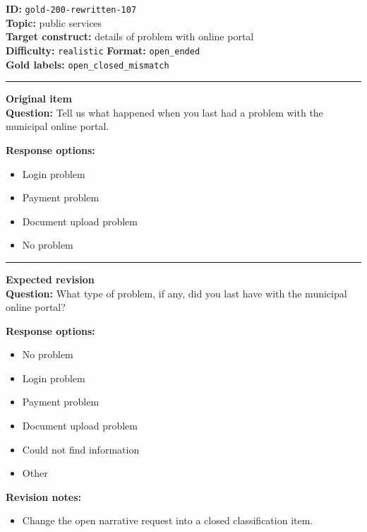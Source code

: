 \documentclass[10pt,a4paper]{article}
\newcommand{\sectionline}{\vspace{0.15em}\hrule\vspace{0.35em}}
\begin{document}
\begin{tcolorbox}[colframe=FlawRed,colback=white,colbacktitle=FlawRed!9,coltitle=black,title={Item 107\hfill Flawed item}]
\textbf{ID:} \texttt{gold-200-rewritten-107}\\
\textbf{Topic:} public services\\
\textbf{Target construct:} details of problem with online portal\\
\textbf{Difficulty:} \texttt{realistic} \quad \textbf{Format:} \texttt{open\_ended}\\
\textbf{Gold labels:} \texttt{open\_closed\_mismatch}\\
\sectionline
\textbf{Original item}\\
\textbf{Question:} Tell us what happened when you last had a problem with the municipal online portal.
\par\textbf{Response options:}
\begin{itemize}
\item Login problem
\item Payment problem
\item Document upload problem
\item No problem
\end{itemize}
\sectionline
\textbf{Expected revision}\\
\textbf{Question:} What type of problem, if any, did you last have with the municipal online portal?
\par\textbf{Response options:}
\begin{itemize}
\item No problem
\item Login problem
\item Payment problem
\item Document upload problem
\item Could not find information
\item Other
\end{itemize}
\par\textbf{Revision notes:}
\begin{itemize}
\item Change the open narrative request into a closed classification item.
\end{itemize}
\end{tcolorbox}
\end{document}

